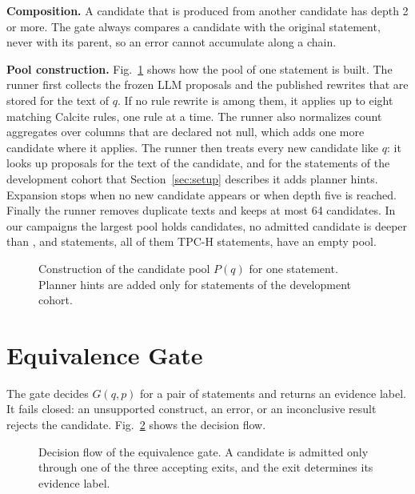 \documentclass[conference]{IEEEtran}
\begin{document}
\textbf{Composition.}
A candidate that is produced from another candidate has depth 2 or more.
The gate always compares a candidate with the original statement, never with its parent, so an error cannot accumulate along a chain.

\textbf{Pool construction.}
Fig.~\ref{fig:pool} shows how the pool of one statement is built.
The runner first collects the frozen LLM proposals and the published rewrites that are stored for the text of $q$.
If no rule rewrite is among them, it applies up to eight matching Calcite rules, one rule at a time.
The runner also normalizes count aggregates over columns that are declared not null, which adds one more candidate where it applies.
The runner then treats every new candidate like $q$: it looks up proposals for the text of the candidate, and for the \SeededQueries{} statements of the development cohort that Section~\ref{sec:setup} describes it adds planner hints.
Expansion stops when no new candidate appears or when depth five is reached.
Finally the runner removes duplicate texts and keeps at most 64 candidates.
In our campaigns the largest pool holds \MaxPool{} candidates, no admitted candidate is deeper than \MaxDepth{}, and \EmptyPools{} statements, all of them TPC-H statements, have an empty pool.

\begin{figure}[t]
  \centering
  
  \caption{Construction of the candidate pool $P(q)$ for one statement. Planner hints are added only for statements of the development cohort.}
  \label{fig:pool}
\end{figure}

\section{Equivalence Gate}
\label{sec:gate}

The gate decides $G(q,p)$ for a pair of statements and returns an evidence label.
It fails closed: an unsupported construct, an error, or an inconclusive result rejects the candidate.
Fig.~\ref{fig:gate} shows the decision flow.

\begin{figure}[t]
  \centering
  
  \caption{Decision flow of the equivalence gate. A candidate is admitted only through one of the three accepting exits, and the exit determines its evidence label.}
  \label{fig:gate}
\end{figure}
\end{document}
